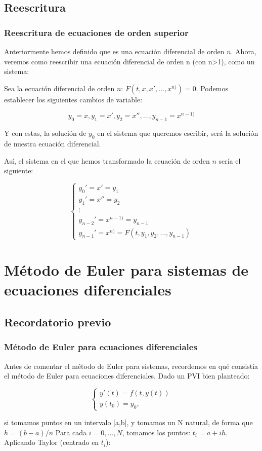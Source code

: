 \documentclass{beamer}
\begin{document}
\subsection{Reescritura}
\begin{frame}
	\frametitle{Reescritura de ecuaciones de orden superior}
Anteriormente hemos definido que es una ecuación diferencial de orden $n$. Ahora, veremos como reescribir una ecuación diferencial de orden n (con n>1), como un sistema:

Sea la ecuación diferencial de orden $n$: $ F(t, x, x', ..., x^{n)}) = 0 $. Podemos establecer los siguientes cambios de variable:

$$y_0 = x, y_1 = x', y_2 = x'', \dots, y_{n-1} = x^{n-1)}$$

Y con estas, la solución de $y_0$ en el sistema que queremos escribir, será la solución de nuestra ecuación diferencial.

\end{frame}

\begin{frame}
	
	Así, el sistema en el que hemos transformado la ecuación de orden $n$ sería el siguiente:
	
	$$
	\begin{cases}
	y_0' = x' = y_1\\
	y_1' = x'' = y_2\\
	\vdots\\
	y_{n-2}' = x^{n-1)} = y_{n-1}\\
	y_{n-1}' = x^{n)} = F(t, y_1, y_2, \dots, y_{n-1})
	\end{cases}
	$$
	
\end{frame}

\section{Método de Euler para sistemas de ecuaciones diferenciales}
\subsection{Recordatorio previo}
\begin{frame}
	\frametitle{Método de Euler para ecuaciones diferenciales}
	
	Antes de comentar el método de Euler para sistemas, recordemos en qué consistía el método de Euler para ecuaciones diferenciales. Dado un PVI bien planteado:
	
	$$
	\begin{cases}
	y'(t)=f(t,y(t)) \\ 
	y(t_0)=y_0, 
	\end{cases}
	$$
	
	si tomamos puntos en un intervalo [a,b], y tomamos un N natural, de forma que $h=(b-a)/n$
	Para cada $i=0,...,N$, tomamos los puntos:
	$t_i=a+ih$. Aplicando Taylor (centrado en $t_i$):
	
	
	
\end{frame}
\end{document}
